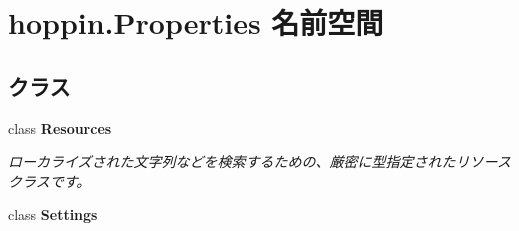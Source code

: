 \hypertarget{namespacehoppin_1_1_properties}{}\section{hoppin.\+Properties 名前空間}
\label{namespacehoppin_1_1_properties}
\subsection*{クラス}
\begin{DoxyCompactItemize}
\item 
class {\bfseries Resources}
\begin{DoxyCompactList}\small\item\em ローカライズされた文字列などを検索するための、厳密に型指定されたリソース クラスです。 \end{DoxyCompactList}\item 
class {\bfseries Settings}
\end{DoxyCompactItemize}
